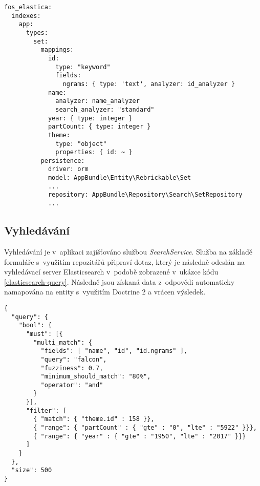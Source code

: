 \begin{listing}[htbp]
  \begin{verbatim}
fos_elastica:
  indexes:
    app:
      types:
        set:
          mappings:
            id:
              type: "keyword"
              fields:
                ngrams: { type: 'text', analyzer: id_analyzer }
            name: 
              analyzer: name_analyzer 
              search_analyzer: "standard"
            year: { type: integer }
            partCount: { type: integer }
            theme:
              type: "object"
              properties: { id: ~ }
          persistence:
            driver: orm
            model: AppBundle\Entity\Rebrickable\Set
            ...
            repository: AppBundle\Repository\Search\SetRepository
            ...
  \end{verbatim}
  \caption{Ukázka nastavení mapování entity \label{elasticsearch-set-index}}
\end{listing}

\subsection{Vyhledávání}
Vyhledávání je v~aplikaci zajišťováno službou \textit{SearchService}. Služba na základě formuláře s~využitím repozitářů připraví dotaz, který je následně odeslán na vyhledávací server Elasticsearch v~podobě zobrazené v~ukázce kódu \ref{elasticsearch-query}. Následně jsou získaná data z~odpovědi automaticky namapována na entity s~využitím Doctrine 2 a vrácen výsledek.

\begin{listing}[htbp]
  \begin{verbatim}
{
  "query": {
    "bool": { 
      "must": [{
        "multi_match": {
          "fields": [ "name", "id", "id.ngrams" ],
          "query": "falcon", 
          "fuzziness": 0.7,
          "minimum_should_match": "80%",
          "operator": "and"
        }
      }],
      "filter": [
        { "match": { "theme.id" : 158 }},
        { "range": { "partCount" : { "gte" : "0", "lte" : "5922" }}},
        { "range": { "year" : { "gte" : "1950", "lte" : "2017" }}}
      ]
    }
  },
  "size": 500
}
        \end{verbatim}
  \caption{Ukázka JSON dotazu Elasticsearch\label{elasticsearch-query}}
\end{listing}

